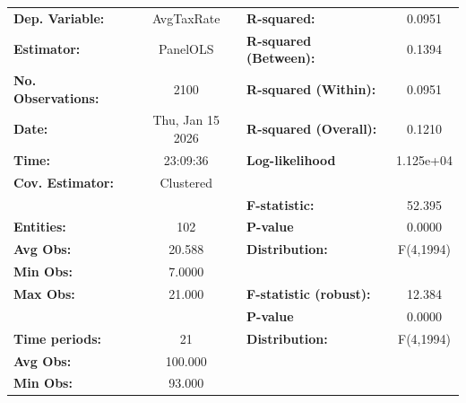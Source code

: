 \begin{center}
\begin{tabular}{lclc}
\toprule
\textbf{Dep. Variable:}                          &     AvgTaxRate     & \textbf{  R-squared:         }   &      0.0951      \\
\textbf{Estimator:}                              &      PanelOLS      & \textbf{  R-squared (Between):}  &      0.1394      \\
\textbf{No. Observations:}                       &        2100        & \textbf{  R-squared (Within):}   &      0.0951      \\
\textbf{Date:}                                   &  Thu, Jan 15 2026  & \textbf{  R-squared (Overall):}  &      0.1210      \\
\textbf{Time:}                                   &      23:09:36      & \textbf{  Log-likelihood     }   &    1.125e+04     \\
\textbf{Cov. Estimator:}                         &     Clustered      & \textbf{                     }   &                  \\
\textbf{}                                        &                    & \textbf{  F-statistic:       }   &      52.395      \\
\textbf{Entities:}                               &        102         & \textbf{  P-value            }   &      0.0000      \\
\textbf{Avg Obs:}                                &       20.588       & \textbf{  Distribution:      }   &    F(4,1994)     \\
\textbf{Min Obs:}                                &       7.0000       & \textbf{                     }   &                  \\
\textbf{Max Obs:}                                &       21.000       & \textbf{  F-statistic (robust):} &      12.384      \\
\textbf{}                                        &                    & \textbf{  P-value            }   &      0.0000      \\
\textbf{Time periods:}                           &         21         & \textbf{  Distribution:      }   &    F(4,1994)     \\
\textbf{Avg Obs:}                                &      100.000       & \textbf{                     }   &                  \\
\textbf{Min Obs:}                                &       93.000       & \textbf{                     }   &                  \\

\end{tabular}
\end{center}
